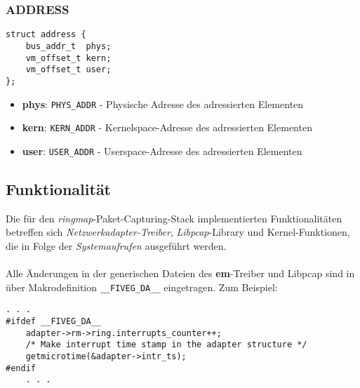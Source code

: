 \subsubsection*{ADDRESS}
\begin{lstlisting}[frame=single, caption={ADDRESS-Struktur}, captionpos={b}, label={code:address_struct}]
struct address {
	bus_addr_t 	phys;
	vm_offset_t	kern;
	vm_offset_t	user;
};
\end{lstlisting}
\begin{itemize}
	\item \textbf{phys}: \verb+PHYS_ADDR+ - Physische Adresse des adressierten Elementen
	\item \textbf{kern}: \verb+KERN_ADDR+ - Kernelspace-Adresse des adressierten Elementen
	\item \textbf{user}: \verb+USER_ADDR+ - Userspace-Adresse des adressierten Elementen
\end{itemize}
\subsection{Funktionalität}
Die für den \emph{ringmap}-Paket-Capturing-Stack implementierten Funktionalitäten
betreffen sich \emph{Netzwerkadapter-Treiber}, \emph{Libpcap}-Library und
Kernel-Funktionen, die in Folge der \emph{Systemaufrufen} ausgeführt werden.\\\\
Alle Änderungen in der generischen Dateien des \textbf{em}-Treiber und Libpcap
sind in über Makrodefinition \verb+__FIVEG_DA__+ eingetragen. Zum Beispiel:
\begin{lstlisting}[frame=single, caption={Code-Einträge in Dateien des generischen em-Treiber}, captionpos={b}, label={code:code_eintr}]
	. . . 
#ifdef __FIVEG_DA__
	adapter->rm->ring.interrupts_counter++;
	/* Make interrupt time stamp in the adapter structure */
	getmicrotime(&adapter->intr_ts);
#endif
	. . . 
\end{lstlisting}	

